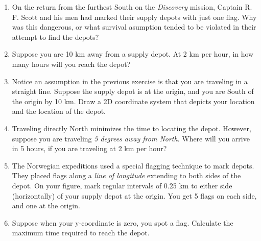 \documentclass{article}
\begin{document}
\begin{enumerate}
\item On the return from the furthest South on the \textit{Discovery} mission, Captain R. F. Scott and his men had marked their supply depots with just one flag.  Why was this dangerous, or what survival asumption tended to be violated in their attempt to find the depots? \\ \vspace{3cm}
\item Suppose you are 10 km away from a supply depot.  At 2 km per hour, in how many hours will you reach the depot? \\ \vspace{2cm}
\item Notice an assumption in the previous exercise is that you are traveling in a straight line.  Suppose the supply depot is at the origin, and you are South of the origin by 10 km.  Draw a 2D coordinate system that depicts your location and the location of the depot. \\ \vspace{4cm}
\item Traveling directly North minimizes the time to locating the depot.  However, suppose you are traveling \textit{5 degrees away from North}.  Where will you arrive in 5 hours, if you are traveling at 2 km per hour? \\ \vspace{3cm}
\item The Norwegian expeditions used a special flagging technique to mark depots.  They placed flags along a \textit{line of longitude} extending to both sides of the depot.  On your figure, mark regular intervals of 0.25 km to either side (horizontally) of your supply depot at the origin.  You get 5 flags on each side, and one at the origin.
\item Suppose when your y-coordinate is zero, you spot a flag.  Calculate the maximum time required to reach the depot.
\end{enumerate}
\end{document}
